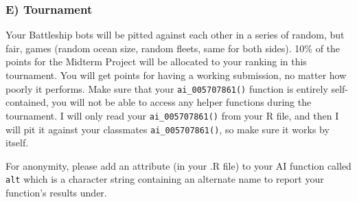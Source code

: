 \documentclass[
]{article}
\begin{document}
\subsubsection{E) Tournament}\label{e-tournament}

Your Battleship bots will be pitted against each other in a series of
random, but fair, games (random ocean size, random fleets, same for both
sides). 10\% of the points for the Midterm Project will be allocated to
your ranking in this tournament. You will get points for having a
working submission, no matter how poorly it performs. Make sure that
your \texttt{ai\_005707861()} function is entirely self-contained, you
will not be able to access any helper functions during the tournament. I
will only read your \texttt{ai\_005707861()} from your R file, and then
I will pit it against your classmates \texttt{ai\_005707861()}, so make
sure it works by itself.

For anonymity, please add an attribute (in your .R file) to your AI
function called \texttt{alt} which is a character string containing an
alternate name to report your function's results under.
\end{document}
